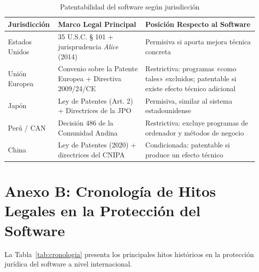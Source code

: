 \documentclass[11pt,a4paper]{report}
\begin{document}
\begin{table}[H]
\centering
\caption{Patentabilidad del software según jurisdicción}
\label{tab:patentes_comp}
\begin{tabularx}{\textwidth}{@{}lXX@{}}
\toprule
\textbf{Jurisdicción} & \textbf{Marco Legal Principal} & \textbf{Posición Respecto al Software} \\
\midrule
Estados Unidos
  & 35 U.S.C. § 101 + jurisprudencia \textit{Alice} (2014)
  & Permisiva si aporta mejora técnica concreta \\
\midrule
Unión Europea
  & Convenio sobre la Patente Europea + Directiva 2009/24/CE
  & Restrictiva: programas «como tales» excluidos; patentable si existe efecto técnico adicional \\
\midrule
Japón
  & Ley de Patentes (Art. 2) + Directrices de la JPO
  & Permisiva, similar al sistema estadounidense \\
\midrule
Perú / CAN
  & Decisión 486 de la Comunidad Andina
  & Restrictiva: excluye programas de ordenador y métodos de negocio \\
\midrule
China
  & Ley de Patentes (2020) + directrices del CNIPA
  & Condicionada: patentable si produce un efecto técnico \\
\bottomrule
\end{tabularx}
\end{table}

\vspace{0.5cm}

\section*{Anexo B: Cronología de Hitos Legales en la Protección del Software}

La Tabla~\ref{tab:cronologia} presenta los principales hitos históricos en la protección jurídica del software a nivel internacional.
\end{document}
